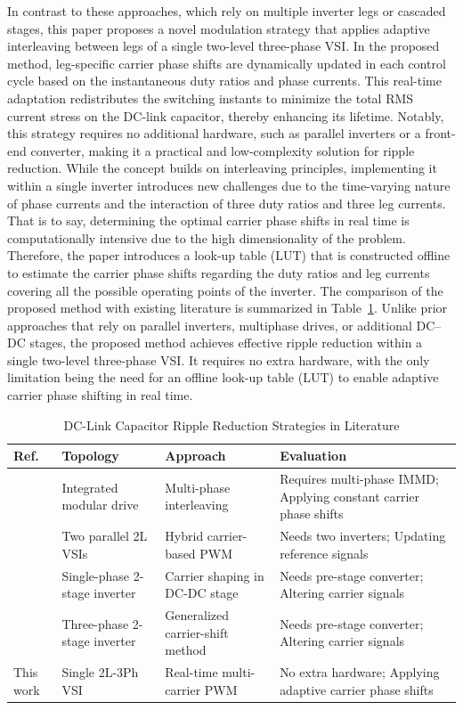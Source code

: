 \documentclass{IPEC2026}
\begin{document}
In contrast to these approaches, which rely on multiple inverter legs or cascaded stages, this paper proposes a novel modulation strategy that applies adaptive interleaving between legs of a single two-level three-phase VSI.
In the proposed method, leg-specific carrier phase shifts are dynamically updated in each control cycle based on the instantaneous duty ratios and phase currents.
This real-time adaptation redistributes the switching instants to minimize the total RMS current stress on the DC-link capacitor, thereby enhancing its lifetime.
Notably, this strategy requires no additional hardware, such as parallel inverters or a front-end converter, making it a practical and low-complexity solution for ripple reduction.
While the concept builds on interleaving principles, implementing it within a single inverter introduces new challenges due to the time-varying nature of phase currents and the interaction of three duty ratios and three leg currents. That is to say, determining the optimal carrier phase shifts in real time is computationally intensive due to the high dimensionality of the problem.
Therefore, the paper introduces a look-up table (LUT) that is constructed offline to estimate the carrier phase shifts regarding the duty ratios and leg currents covering all the possible operating points of the inverter. 
The comparison of the proposed method with existing literature is summarized in Table~\ref{tab:ripple_comparison}. 
Unlike prior approaches that rely on parallel inverters, multiphase drives, or additional DC–DC stages, the proposed method achieves effective ripple reduction within a single two-level three-phase VSI. 
It requires no extra hardware, with the only limitation being the need for an offline look-up table (LUT) to enable adaptive carrier phase shifting in real time.


\begin{table}[t]
\centering
\caption{DC-Link Capacitor Ripple Reduction Strategies in Literature}
\label{tab:ripple_comparison}
\begin{tabular}{p{1.2cm} p{3.5cm} p{3.8cm} p{8cm}}
\hline
Ref. & Topology & Approach & Evaluation \\
\hline
\cite{Interleaving-DualMotor} & Integrated modular drive & Multi-phase interleaving & Requires multi-phase IMMD; Applying constant carrier phase shifts \\
\cite{DualMotor-Interleaved-Parallel} & Two parallel 2L VSIs & Hybrid carrier-based PWM & Needs two inverters; Updating reference signals  \\
\cite{TwoStage-RippleReduction} & Single-phase 2-stage inverter & Carrier shaping in DC-DC stage & Needs pre-stage converter; Altering carrier signals  \\
\cite{PhaseShift-PreConverter} & Three-phase 2-stage inverter & Generalized carrier-shift method & Needs pre-stage converter;  Altering carrier signals \\
This work & Single 2L-3Ph VSI & Real-time multi-carrier PWM & No extra hardware; Applying adaptive carrier phase shifts\\
\hline
\end{tabular}
\end{table}
\end{document}
